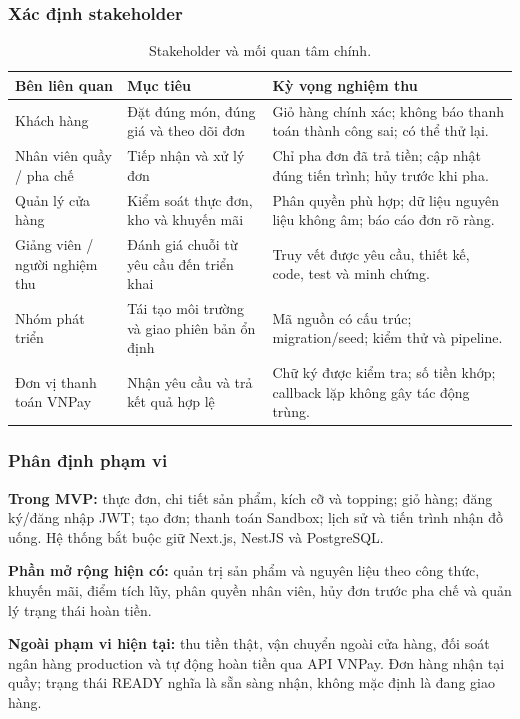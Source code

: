 \documentclass[12pt,a4paper]{article}
\begin{document}
\subsubsection{Xác định stakeholder}
\begin{table}[H]\centering\small
\begin{tabularx}{\textwidth}{P{3.0cm}YY}
\toprule\textbf{Bên liên quan}&\textbf{Mục tiêu}&\textbf{Kỳ vọng nghiệm thu}\\\midrule
Khách hàng&Đặt đúng món, đúng giá và theo dõi đơn&Giỏ hàng chính xác; không báo thanh toán thành công sai; có thể thử lại.\\
Nhân viên quầy / pha chế&Tiếp nhận và xử lý đơn&Chỉ pha đơn đã trả tiền; cập nhật đúng tiến trình; hủy trước khi pha.\\
Quản lý cửa hàng&Kiểm soát thực đơn, kho và khuyến mãi&Phân quyền phù hợp; dữ liệu nguyên liệu không âm; báo cáo đơn rõ ràng.\\
Giảng viên / người nghiệm thu&Đánh giá chuỗi từ yêu cầu đến triển khai&Truy vết được yêu cầu, thiết kế, code, test và minh chứng.\\
Nhóm phát triển&Tái tạo môi trường và giao phiên bản ổn định&Mã nguồn có cấu trúc; migration/seed; kiểm thử và pipeline.\\
Đơn vị thanh toán VNPay&Nhận yêu cầu và trả kết quả hợp lệ&Chữ ký được kiểm tra; số tiền khớp; callback lặp không gây tác động trùng.\\
\bottomrule\end{tabularx}
\caption{Stakeholder và mối quan tâm chính.}
\end{table}

\subsubsection{Phân định phạm vi}
\textbf{Trong MVP:} thực đơn, chi tiết sản phẩm, kích cỡ và topping; giỏ hàng; đăng ký/đăng nhập JWT; tạo đơn; thanh toán Sandbox; lịch sử và tiến trình nhận đồ uống. Hệ thống bắt buộc giữ Next.js, NestJS và PostgreSQL.

\textbf{Phần mở rộng hiện có:} quản trị sản phẩm và nguyên liệu theo công thức, khuyến mãi, điểm tích lũy, phân quyền nhân viên, hủy đơn trước pha chế và quản lý trạng thái hoàn tiền.

\textbf{Ngoài phạm vi hiện tại:} thu tiền thật, vận chuyển ngoài cửa hàng, đối soát ngân hàng production và tự động hoàn tiền qua API VNPay. Đơn hàng nhận tại quầy; trạng thái READY nghĩa là sẵn sàng nhận, không mặc định là đang giao hàng.
\end{document}
